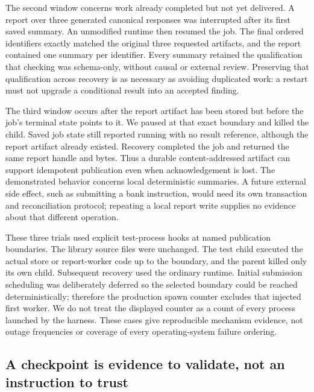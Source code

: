 The second window concerns work already completed but not yet delivered.
A report over three generated canonical responses was interrupted after its
first saved summary. An unmodified runtime then resumed the job. The final
ordered identifiers exactly matched the original three requested artifacts,
and the report contained one summary per identifier. Every summary retained
the qualification that checking was schema-only, without causal or external
review. Preserving that qualification across recovery is as necessary as
avoiding duplicated work: a restart must not upgrade a conditional result into
an accepted finding. \citep{exec14_failure_observations}

The third window occurs after the report artifact has been stored but before the
job's terminal state points to it. We paused at that exact boundary and killed
the child. Saved job state still reported running with no result reference,
although the report artifact already existed. Recovery completed the job and
returned the same report handle and bytes. Thus a durable content-addressed
artifact can support idempotent publication even when acknowledgement is lost.
The demonstrated behavior concerns local deterministic summaries. A future
external side effect, such as submitting a bank instruction, would need its own
transaction and reconciliation protocol; repeating a local report write supplies
no evidence about that different operation. \citep{exec14_failure_observations,exec14_failure_design}

These three trials used explicit test-process hooks at named publication
boundaries. The library source files were unchanged. The test child executed
the actual store or report-worker code up to the boundary, and the parent killed
only its own child. Subsequent recovery used the ordinary runtime. Initial
submission scheduling was deliberately deferred so the selected boundary could
be reached deterministically; therefore the production spawn counter excludes
that injected first worker. We do not treat the displayed counter as a count
of every process launched by the harness. These cases give reproducible
mechanism evidence, not outage frequencies or coverage of every operating-system
failure ordering. \citep{exec14_failure_observations}

\subsection{A checkpoint is evidence to validate, not an instruction to trust}

